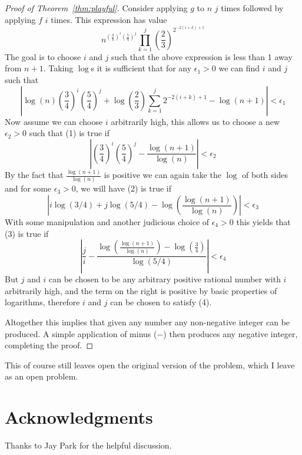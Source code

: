 \documentclass[10pt]{article}
\begin{document}
\begin{proof}[Proof of Theorem~\ref{thm:playful}]
	Consider applying $g$ to $n$ $j$ times followed by applying $f$ $i$ times.  This expression has value
		$$n^{\left(\frac{3}{4}\right)^i \left(\frac{5}{4}\right)^j} \prod_{k = 1}^{j} \left(\frac{2}{3} \right)^{2^{-2(i+k)+1}}$$
	The goal is to choose $i$ and $j$ such that the above expression is less than 1 away from $n+1$.  Taking $\log$s it is sufficient that for any $\epsilon_1 > 0$ we can find $i$ and $j$ such that
	\begin{equation}
		\left| \log(n) \left(\frac{3}{4}\right)^i \left(\frac{5}{4}\right)^j + \log\left(\frac{2}{3}\right) \sum_{k = 1}^{j} 2^{-2(i+k)+1} - \log(n+1) \right| < \epsilon_1
	\end{equation}
	Now assume we can choose $i$ arbitrarily high, this allows us to choose a new $\epsilon_2 > 0$ such that (1) is true if
	\begin{equation}
		\left| \left(\frac{3}{4}\right)^i \left(\frac{5}{4}\right)^j - \frac{\log(n+1)}{\log(n)} \right| < \epsilon_2
	\end{equation}
	By the fact that $\frac{\log(n+1)}{\log(n)}$ is positive we can again take the $\log$ of both sides and for some $\epsilon_3 > 0$, we will have (2) is true if
	\begin{equation}
		\left| i\log\left(3/4\right) +  j\log\left(5/4\right) - \log\left(\frac{\log(n+1)}{\log(n)}\right) \right| < \epsilon_3
	\end{equation}
	With some manipulation and another judicious choice of $\epsilon_4 > 0$ this yields that (3) is true if
	\begin{equation}
		\left| \frac{j}{i} - \frac{\log\left(\frac{\log(n+1)}{\log(n)}\right) - \log\left(\frac{3}{4}\right)}{\log\left(5/4\right)} \right| < \epsilon_4
	\end{equation}
	But $j$ and $i$ can be chosen to be any arbitrary positive rational number with $i$ arbitrarily high, and the term on the right is positive by basic properties of logarithms, therefore $i$ and $j$ can be chosen to satisfy (4).
	
	Altogether this implies that given any number any non-negative integer can be produced.  A simple application of minus ($-$) then produces any negative integer, completing the proof.
\end{proof}

This of course still leaves open the original version of the problem, which I leave as an open problem.

\section*{Acknowledgments}

Thanks to Jay Park for the helpful discussion.
\end{document}
